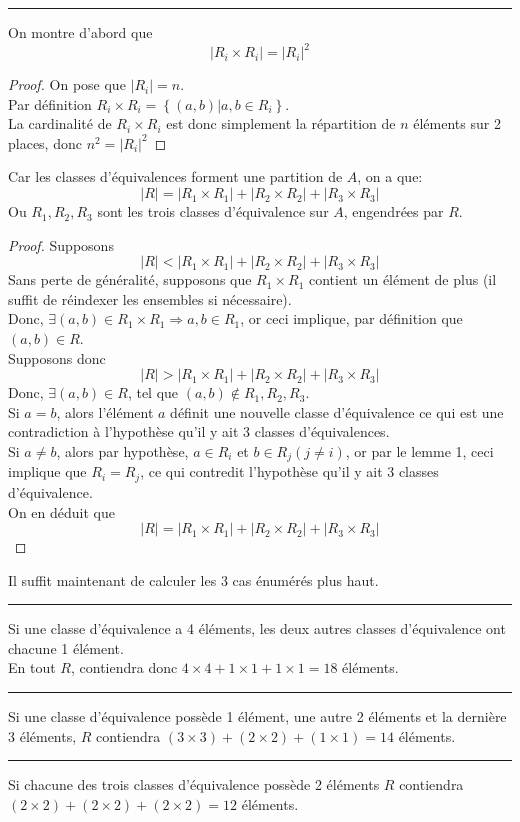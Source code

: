\documentclass[11pt, a4paper]{article}
\newcommand\hr{
    \noindent\rule[0.5ex]{\linewidth}{0.5pt}\newline
}
\begin{document}
\hr
On montre d'abord que 
\[ 
	| R_i \times R_i | = | R_i| ^{2}
\]
\begin{proof}
On pose que $|R_i|=n$.\\
Par définition $R_i \times R_i = \left\{ ( a,b) | a,b \in R_i \right\} $.\\
La cardinalité de $R_i \times R_i$ est donc simplement la répartition de $n$ éléments sur 2 places, donc $n^{2}= | R_i|^{2}$
\end{proof}
Car les classes d'équivalences forment une partition de $A$, on a que:
\[ 
|R| = |R_1\times R_1| +|R_2\times R_2|+|R_3\times R_3|
\]
Ou $ R_1,R_2,R_3$ sont les trois classes d'équivalence sur $A$, engendrées par $R$.
\begin{proof}
Supposons 
\[ 
|R| < |R_1\times R_1| +|R_2\times R_2|+|R_3\times R_3|
\]
Sans perte de généralité, supposons que $R_1 \times R_1$ contient un élément de plus (il suffit de réindexer les ensembles si nécessaire).\\
Donc, $\exists ( a,b) \in R_1 \times R_1 \Rightarrow  a, b \in R_1$, or ceci implique, par définition que $(a,b) \in  R$.\\
Supposons donc
\[ 
|R| > |R_1\times R_1| +|R_2\times R_2|+|R_3\times R_3|
\]
Donc, $\exists ( a,b) \in R$, tel que $(a,b) \notin R_1, R_2, R_3$.\\
Si $a=b$, alors l'élément $a$ définit une nouvelle classe d'équivalence ce qui est une contradiction à l'hypothèse qu'il y ait 3 classes d'équivalences.\\
Si $a\neq b$, alors par hypothèse, $a \in R_i$ et $b \in R_j ( j \neq i)$, or par le lemme 1, ceci implique que $R_i = R_j$, ce qui contredit l'hypothèse qu'il y ait 3 classes d'équivalence.\\
On en déduit que
\[ 
|R| = |R_1\times R_1| +|R_2\times R_2|+|R_3\times R_3|
\]
\end{proof}
Il suffit maintenant de calculer les 3 cas énumérés plus haut.\\
\hr
Si une classe d'équivalence a 4 éléments,
les deux autres classes d'équivalence ont chacune 1 élément.\\
En tout $R$, contiendra donc $4\times 4 + 1\times 1 + 1 \times 1=18$ éléments.\\
\hr
Si une classe d'équivalence possède 1 élément, une autre 2 éléments et la dernière 3 éléments, $R$ contiendra
$(3\times 3) + (2\times 2) + ( 1 \times 1 ) =14$ éléments.\\
\hr
Si chacune des trois classes d'équivalence possède 2 éléments $R$ contiendra
$ (2 \times 2) + (2 \times 2) +(2 \times 2) = 12$ éléments.\\
\end{document}
